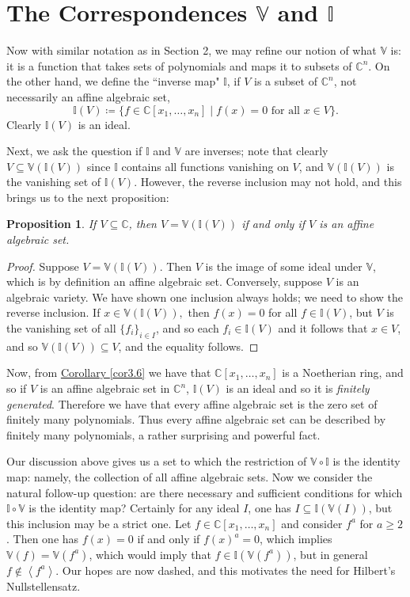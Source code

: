 \documentclass[letterpaper]{article}
\newtheorem{proposition}[theorem]{Proposition}
\theoremstyle{definition}
\theoremstyle{remark}
\newcommand\CC{\mathbb{C}}
\newcommand\VV{\mathbb{V}}
\newcommand\II{\mathbb{I}}
\newcommand{\defeq}{\coloneqq}
\newcommand{\abrackets}[1]{\left\langle#1\right\rangle}
\begin{document}
\section{The Correspondences \texorpdfstring{$\VV$}{V} and \texorpdfstring{$\II$}{I}}
Now with similar notation as in Section 2, we may refine our notion of what $\VV$ is: it is a function that takes sets of polynomials and maps it to subsets of $\CC^n$. On the other hand, we define the ``inverse map" $\II$, if $V$ is a subset of $\CC^n$, not necessarily an affine algebraic set, \[\II(V)\defeq \{f\in\CC[x_1,\dots,x_n]\mid f(x)=0\text{ for all } x\in V\}.\] Clearly $\II(V)$ is an ideal. 

Next, we ask the question if $\II$ and $\VV$ are inverses; note that clearly $V\subseteq \VV(\II(V))$ since $\II$ contains all functions vanishing on $V$, and $\VV(\II(V))$ is the vanishing set of $\II(V)$. However, the reverse inclusion may not hold, and this brings us to the next proposition: \begin{proposition}
    If $V\subseteq \CC$, then $V=\VV(\II(V))$ if and only if $V$ is an affine algebraic set. 
\end{proposition} \begin{proof}
    Suppose $V=\VV(\II(V))$. Then $V$ is the image of some ideal under $\VV$, which is by definition an affine algebraic set. Conversely, suppose $V$ is an algebraic variety. We have shown one inclusion always holds; we need to show the reverse inclusion. If $x\in \VV(\II(V)),$ then $f(x)=0$ for all $f\in\II(V)$, but $V$ is the vanishing set of all $\{f_i\}_{i\in I}$, and so each $f_i\in \II(V)$ and it follows that $x\in V$, and so $\VV(\II(V))\subseteq V$, and the equality follows.
\end{proof} 

Now, from \hyperref[cor3.6]{Corollary \ref*{cor3.6}} we have that $\CC[x_1,\dots,x_n]$ is a Noetherian ring, and so if $V$ is an affine algebraic set in $\CC^n$, $\II(V)$ is an ideal and so it is \textit{finitely generated}. Therefore we have that every affine algebraic set is the zero set of finitely many polynomials. Thus every affine algebraic set can be described by finitely many polynomials, a rather surprising and powerful fact. 

Our discussion above gives us a set to which the restriction of $\VV\circ \II$ is the identity map: namely, the collection of all affine algebraic sets. Now we consider the natural follow-up question: are there necessary and sufficient conditions for which $\II\circ \VV$ is the identity map? Certainly for any ideal $I$, one has $I\subseteq \II(\VV(I))$, but this inclusion may be a strict one. Let $f\in\CC[x_1,\dots,x_n]$ and consider $f^a$ for $a\ge 2$. Then one has $f(x)=0$ if and only if $f(x)^a=0$, which implies $\VV(f)=\VV(f^a)$, which would imply that $f\in \II(\VV(f^a))$, but in general $f\notin \abrackets{f^a}$. Our hopes are now dashed, and this motivates the need for Hilbert's Nullstellensatz. 
\end{document}
